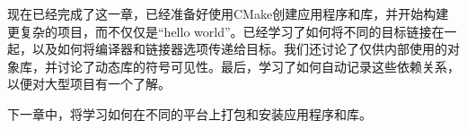 现在已经完成了这一章，已经准备好使用CMake创建应用程序和库，并开始构建更复杂的项目，而不仅仅是“hello world”。已经学习了如何将不同的目标链接在一起，以及如何将编译器和链接器选项传递给目标。我们还讨论了仅供内部使用的对象库，并讨论了动态库的符号可见性。最后，学习了如何自动记录这些依赖关系，以便对大型项目有一个了解。

下一章中，将学习如何在不同的平台上打包和安装应用程序和库。